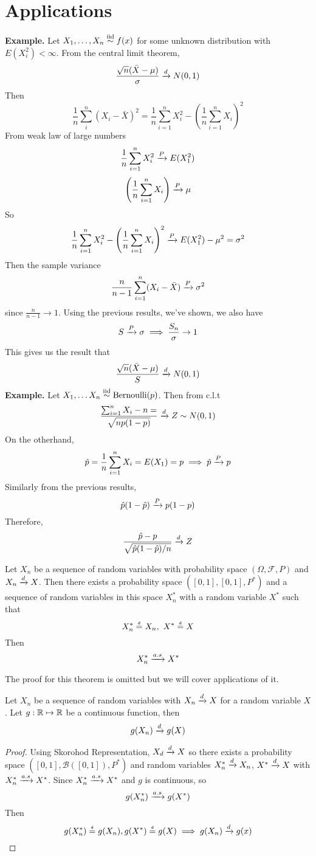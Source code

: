\documentclass[openany]{report}
\begin{document}
\section*{Applications}
\textbf{Example.} Let $X_1, \ldots, X_n \overset{\mathrm{iid}}{\sim} f(x)$ for some unknown distribution with $E(X_i^2) < \infty$. From the central limit theorem, 
\[\frac{\sqrt{n}(\bar{X} - \mu)}{\sigma} \xrightarrow{d} N(0,1)\]
Then 
\[\frac{1}{n}\sum_{i}^n (X_i-\bar{X})^2 = \frac{1}{n}\sum_{i=1}^nX_i^2 - \left(\frac{1}{n}\sum_{i=1}^n X_i\right)^2 \]
From weak law of large numbers 
\[ \frac{1}{n}\sum_{i=1}^nX_i^2 \xrightarrow{P} E(X_1^2)\]
\[\left(\frac{1}{n}\sum_{i=1}^n X_i\right) \xrightarrow{P} \mu\]
So 
\[\frac{1}{n}\sum_{i=1}^nX_i^2 - \left(\frac{1}{n}\sum_{i=1}^n X_i\right)^2  \xrightarrow{P} E(X_1^2) - \mu^2 = \sigma^2\]
Then the sample variance 
\[\frac{n}{n-1}\sum_{i=1}^n (X_i - \bar{X}) \xrightarrow{P} \sigma^2\]
since $\frac{n}{n-1} \rightarrow 1$. Using the previous results, we've shown, we also have 
\[S \xrightarrow{P} \sigma \implies \frac{S_n}{\sigma} \rightarrow 1\]
This gives us the result that 
\[\frac{\sqrt{n}(\bar{X} - \mu)}{S} \xrightarrow{d} N(0,1)\]
\textbf{Example.} Let $X_1, \ldots X_n \overset{\mathrm{iid}}{\sim} \operatorname{Bernoulli}(p)$. Then from c.l.t
\[\frac{\sum_{i=1}^n X_i - n=}{\sqrt{np(1-p)}} \xrightarrow{d} Z \sim N(0,1)\]
On the otherhand, 
\[\hat{p} = \frac{1}{n}\sum_{i=1}^n X_i= E(X_1) = p \implies \hat{p} \xrightarrow{P} p\]
Similarly from the previous results, 
\[\hat{p}(1-\hat{p}) \xrightarrow{P} p(1-p)\]
Therefore, 
\[\frac{\hat{p} - p}{\sqrt{\hat{p}(1-\hat{p})/n}} \xrightarrow{d} Z \]
\begin{theorem}
    Let $X_n$ be a sequence of random variables with probability space $(\Omega, \mathcal{F}, P)$ and $X_n \xrightarrow{d} X$. Then there exists a probability space $([0,1], \mathcal{[0,1]}, P^*)$ and a sequence of random variables in this space $X_n^*$ with a random variable $X^*$ such that 
    \[X_n^* \eqd X_n, \ X^* \eqd X \]
    Then
    \[X_n^* \xrightarrow{a.s} X^*\]
\end{theorem}
The proof for this theorem is omitted but we will cover applications of it. 
\begin{theorem}
    Let $X_n$ be a sequence of random variables with $X_n \xrightarrow{d} X$ for a random variable $X$. Let $g: \mathbb{R} \mapsto \mathbb{R}$ be a continuous function, then 
    \[g(X_n)\xrightarrow{d} g(X)\] 
\end{theorem}

\begin{proof}
    Using Skorohod Representation, $X_d \xrightarrow{d} X$ so there exists a probability space $([0,1], \mathcal{B}([0,1]), P^*)$ and random variables $X_n^* \xrightarrow{d} X_n$, $X^*\xrightarrow{d} X$ with $X_n^* \xrightarrow{a.s} X^*$. Since $X_n^* \xrightarrow{a.s} X^*$ and $g$ is continuous, so 
    \[g(X_n^*) \xrightarrow{a.s} g(X^*)\]
    Then 
    \[g(X_n^*) \eqd g(X_n), g(X^*) \eqd g(X) \implies g(X_n) \cond g(x)\]
\end{proof}
\end{document}
